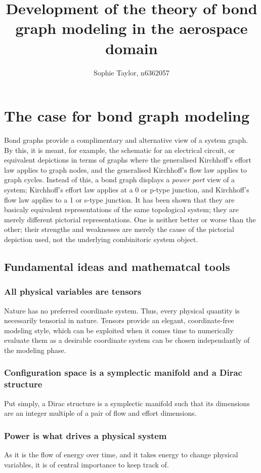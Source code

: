 \documentclass[utf,a4paper,12pt]{report}
\title{Development of the theory of bond graph modeling in the aerospace domain}
\author{Sophie Taylor, n6362057}
\begin{document}
\maketitle
\chapter{The case for bond graph modeling}
Bond graphs provide a complimentary and alternative view of a system graph. By this, it is meant, for example, the schematic for an electrical circuit, or equivalent depictions in terms of graphs where the generalised Kirchhoff's effort law applies to graph nodes, and the generalised Kirchhoff's flow law applies to graph cycles. Instead of this, a bond graph displays a \emph{power port} view of a system; Kirchhoff's effort law applies at a 0 or p-type junction, and Kirchhoff's flow law applies to a 1 or s-type junction. It has been shown that they are basicaly equivalent representations of the same topological system; they are merely different pictorial representations. One is neither better or worse than the other; their strengths and weaknesses are merely the cause of the pictorial depiction used, not the underlying combinitoric system object.
\section{Fundamental ideas and mathematcal tools}
\subsection{All physical variables are tensors}
Nature has no preferred coordinate system. Thus, every physical quantity is necessarily tensorial in nature. Tensors provide an elegant, coordinate-free modeling style, which can be exploited when it comes time to numerically evaluate them as a desirable coordinate system can be chosen independantly of the modeling phase.
\subsection{Configuration space is a symplectic manifold and a Dirac structure}
Put simply, a Dirac structure is a symplectic manifold such that its dimensions are an integer multiple of a pair of flow and effort dimensions. 
\subsection{Power is what drives a physical system}
As it is the flow of energy over time, and it takes energy to change physical variables, it is of central importance to keep track of.
\end{document}
